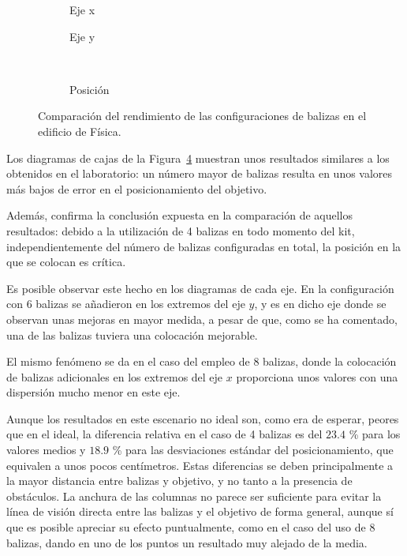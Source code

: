\begin{figure}[H]
  \centering
    \begin{subfigure}[b]{.3\textwidth}
      \centering
      \hspace*{-0.8cm}
       
      \caption{Eje x}
      \label{fig:boxplot_fisica_x}
    \end{subfigure}
    \hspace*{0.1cm}
    \begin{subfigure}[b]{.3\textwidth}
      \centering
        
      \caption{Eje y}
      \label{fig:boxplot_fisica_y}
    \end{subfigure}
    ~~~~
    \begin{subfigure}[b]{.3\textwidth}
        \centering
          
        \caption{Posición}
        \label{fig:boxplot_fisica_pos}
      \end{subfigure}
    \caption{Comparación del rendimiento de las configuraciones de balizas en el edificio de Física.}
    \label{fig:boxplot_fisica}
\end{figure}

Los diagramas de cajas de la Figura~\ref{fig:boxplot_fisica} muestran unos resultados similares a los obtenidos en el laboratorio: un número mayor de balizas resulta en unos valores más bajos de error en el posicionamiento del objetivo.

Además, confirma la conclusión expuesta en la comparación de aquellos resultados: debido a la utilización de 4 balizas en todo momento del kit, independientemente del número de balizas configuradas en total, la posición en la que se colocan es crítica.

Es posible observar este hecho en los diagramas de cada eje.
En la configuración con 6 balizas se añadieron en los extremos del eje $y$, y es en dicho eje donde se observan unas mejoras en mayor medida, a pesar de que, como se ha comentado, una de las balizas tuviera una colocación mejorable.

El mismo fenómeno se da en el caso del empleo de 8 balizas, donde la colocación de balizas adicionales en los extremos del eje $x$ proporciona unos valores con una dispersión mucho menor en este eje.

Aunque los resultados en este escenario no ideal son, como era de esperar, peores que en el ideal, la diferencia relativa en el caso de 4 balizas es del $23.4$ \% para los valores medios y $18.9$ \% para las desviaciones estándar del posicionamiento, que equivalen a unos pocos centímetros.
Estas diferencias se deben principalmente a la mayor distancia entre balizas y objetivo, y no tanto a la presencia de obstáculos.
La anchura de las columnas no parece ser suficiente para evitar la línea de visión directa entre las balizas y el objetivo de forma general, aunque sí que es posible apreciar su efecto puntualmente, como en el caso del uso de 8 balizas, dando en uno de los puntos un resultado muy alejado de la media.

